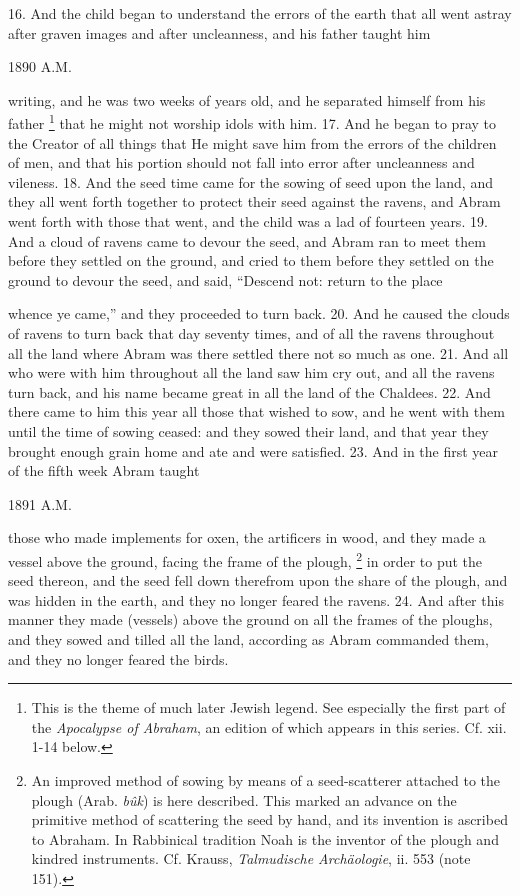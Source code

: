 
16. And the child began to understand the errors of the earth that all went astray after graven images and after uncleanness, and his father taught him

1890 A.M.

writing, and he was two weeks of years old, and he separated himself from his father \footnote{This is the theme of much later Jewish legend. See especially the first part of the \emph{Apocalypse of Abraham}, an edition of which appears in this series. Cf. xii. 1-14 below.} that he might not worship idols with him. 17. And he began to pray to the Creator of all things that He might save him from the errors of the children of men, and that his portion should not fall into error after uncleanness and vileness. 18. And the seed time came for the sowing of seed upon the land, and they all went forth together to protect their seed against the ravens, and Abram went forth with those that went, and the child was a lad of fourteen years. 19. And a cloud of ravens came to devour the seed, and Abram ran to meet them before they settled on the ground, and cried to them before they settled on the ground to devour the seed, and said, ``Descend not: return to the place

whence ye came,'' and they proceeded to turn back. 20. And he caused the clouds of ravens to turn back that day seventy times, and of all the ravens throughout all the land where Abram was there settled there not so much as one. 21. And all who were with him throughout all the land saw him cry out, and all the ravens turn back, and his name became great in all the land of the Chaldees. 22. And there came to him this year all those that wished to sow, and he went with them until the time of sowing ceased: and they sowed their land, and that year they brought enough grain home and ate and were satisfied. 23. And in the first year of the fifth week Abram taught

1891 A.M.

those who made implements for oxen, the artificers in wood, and they made a vessel above the ground, facing the frame of the plough, \footnote{An improved method of sowing by means of a seed-scatterer attached to the plough (Arab. \emph{bûk}) is here described. This marked an advance on the primitive method of scattering the seed by hand, and its invention is ascribed to Abraham. In Rabbinical tradition Noah is the inventor of the plough and kindred instruments. Cf. Krauss, \emph{Talmudische Archäologie}, ii. 553 (note 151).} in order to put the seed thereon, and the seed fell down therefrom upon the share of the plough, and was hidden in the earth, and they no longer feared the ravens. 24. And after this manner they made (vessels) above the ground on all the frames of the ploughs, and they sowed and tilled all the land, according as Abram commanded them, and they no longer feared the birds.

